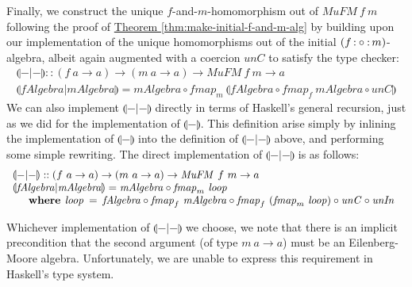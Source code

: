 \documentclass{jfp1}
\newcommand{\fold}[1]{\llparenthesis #1 \rrparenthesis}
\newcommand{\eFold}[2]{\llparenthesis #1|#2 \rrparenthesis}
\newcommand{\thmref}[1]{\hyperref[#1]{Theorem \ref*{#1}}}
\newcommand{\kw}[1]{\textbf{#1}}
\begin{document}
Finally, we construct the unique $f$-and-$m$-homomorphism out of
$\mathit{MuFM}~f~m$ following the proof of
\thmref{thm:make-initial-f-and-m-alg} by building upon our
implementation of the unique homomorphisms out of the initial $(f
\mathop{\mathord:\circ\mathord:} m)$-algebra, albeit again augmented with a coercion
$\mathit{unC}$ to satisfy the type checker:
\begin{displaymath}
  \begin{array}{l}
    \eFold{-}{-} :: (f~a \to a) \to (m~a \to a) \to \mathit{MuFM}~f~m \to a \\
    \eFold{\mathit{fAlgebra}}{\mathit{mAlgebra}} = \mathit{mAlgebra} \circ \mathit{fmap}_m~\fold{\mathit{fAlgebra} \circ \mathit{fmap}_f~\mathit{mAlgebra} \circ \mathit{unC}}
  \end{array}
\end{displaymath}
We can also implement $\eFold{-}{-}$ directly in terms of Haskell's
general recursion, just as we did for the implementation of
$\fold{-}$. This definition arise simply by inlining the
implementation of $\fold{-}$ into the definition of $\eFold{-}{-}$
above, and performing some simple rewriting. The direct implementation
of $\eFold{-}{-}$ is as follows:
\begin{displaymath}
  \begin{array}{l}
    \eFold{-}{-} :: (f~a \to a) \to (m~a \to a) \to \mathit{MuFM}~f~m \to a \\
    \eFold{\mathit{fAlgebra}}{\mathit{mAlgebra}} = \mathit{mAlgebra} \circ \mathit{fmap}_m~\mathit{loop} \\
    \quad\begin{array}{r@{\hspace{0.4em}}l@{\hspace{0.5em}}c@{\hspace{0.5em}}l}
      \kw{where} & \mathit{loop} &=& \mathit{fAlgebra} \circ \mathit{fmap}_f~\mathit{mAlgebra} \circ \mathit{fmap}_f~(\mathit{fmap}_m~\mathit{loop}) \circ \mathit{unC} \circ \mathit{unIn}
    \end{array}
  \end{array}
\end{displaymath}

Whichever implementation of $\eFold{-}{-}$ we choose, we note that
there is an implicit precondition that the second argument (of type
$m~a \to a$) must be an Eilenberg-Moore algebra. Unfortunately, we are
unable to express this requirement in Haskell's type system. 



\end{document}
